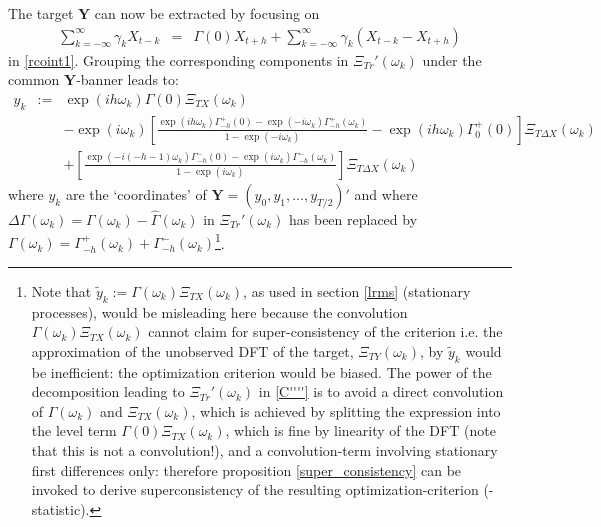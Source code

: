 \documentclass[11pt]{article}
\begin{document}
The target $\mathbf{Y}$ can now be extracted by focusing on 
\begin{eqnarray*}
\sum_{k=-\infty}^\infty\gamma_kX_{t-k}&=&\Gamma(0)X_{t+h}+\sum_{k=-\infty}^\infty \gamma_{k}(X_{t-k}-X_{t+h})
\end{eqnarray*} 
in \ref{rcoint1}. Grouping the corresponding  components in $\Xi_{Tr}'(\omega_k)$ under the common $\mathbf{Y}$-banner leads to: 
\begin{eqnarray}
y_k&:=&\exp(ih\omega_k)\Gamma(0)\Xi_{TX}(\omega_k)\label{nstarget}\\
&&-\exp(i\omega_k)\left[\frac{\exp(ih\omega_k)\Gamma_{-h}^{+}(0)-\exp(-i\omega_k)\Gamma_{-h}^{+}(\omega_k)}{1-\exp(-i\omega_k)}-\exp(ih\omega_k)\Gamma_{0}^{+}(0)\right]\Xi_{T\Delta X}(\omega_k)\nonumber\label{nsY}\\
&&+\left[\frac{\exp(-i(-h-1)\omega_k)\Gamma_{-h}^{-}(0)-\exp(i\omega_k)\Gamma_{-h}^{-}(\omega_k)}{1-\exp(i\omega_k)}\right]\Xi_{T\Delta X}(\omega_k)\nonumber
\end{eqnarray} 
where $y_k$ are the `coordinates' of $\mathbf{Y}=(y_0,y_1,...,y_{T/2})'$ and where $\Delta\Gamma(\omega_k)=\Gamma(\omega_k)-\hat{\Gamma}(\omega_k)$ in $\Xi_{Tr}'(\omega_k)$ has been replaced by $\Gamma(\omega_k)=\Gamma_{-h}^+(\omega_k)+\Gamma_{-h}^-(\omega_k)$\footnote{Note that $\tilde{y}_k:=\Gamma(\omega_k)\Xi_{TX}(\omega_k)$, as used in section \ref{lrms} (stationary processes), would be misleading here because the convolution $\Gamma(\omega_k)\Xi_{TX}(\omega_k)$ cannot claim for super-consistency of the criterion i.e. the approximation of the unobserved DFT of the target, $\Xi_{TY}(\omega_k)$, by $\tilde{y}_k$ would be inefficient: the optimization criterion would be biased.  The power of the decomposition leading to $\Xi_{Tr}'(\omega_k)$ in \ref{C''''} is to avoid a direct convolution of $\Gamma(\omega_k)$ and $\Xi_{TX}(\omega_k)$, which is achieved by splitting the expression into the level term $\Gamma(0)\Xi_{TX}(\omega_k)$, which is fine by linearity of the DFT (note that this  is not a convolution!), and a convolution-term involving stationary first differences only: therefore proposition \ref{super_consistency} can be invoked to derive superconsistency of the resulting optimization-criterion (-statistic).}. \\
\end{document}

